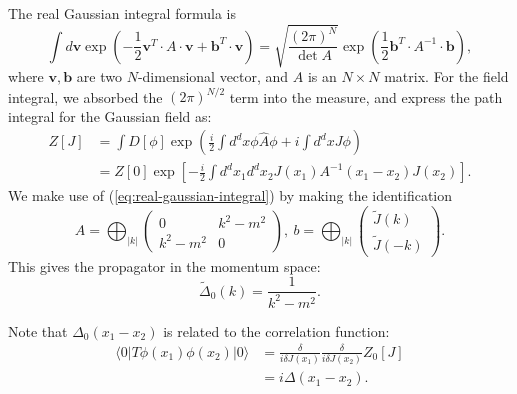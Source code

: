 \begin{framedrmk}
The real Gaussian integral formula is
\begin{equation}
	\int d\bm v \exp\left(-\frac{1}{2}\bm{v}^T \cdot A\cdot \bm{v} + \bm{b}^T \cdot \bm{v}\right) 
	= \sqrt{\frac{(2\pi)^N}{\det{A}}}\exp\left(\frac{1}{2}\bm{b}^T \cdot A^{-1} \cdot \bm{b}\right),
	\label{eq:real-gaussian-integral}
\end{equation}
where $\bm v, \bm b$ are two $N$-dimensional vector, and $A$ is an $N\times N$ matrix.
For the field integral, we absorbed the $(2\pi)^{N/2}$ term into the measure, and express the path integral for the Gaussian field as:
\begin{equation*}
\begin{aligned}
	Z[J] &= \int D[\phi] \exp\left(\frac{i}{2}\int d^dx \phi \hat{A} \phi +i \int d^d xJ \phi\right) \\
	&= Z[0] \exp\left[-\frac{i}{2}\int d^d x_1 d^d x_2 J(x_1) A^{-1}(x_1-x_2) J(x_2)\right].
\end{aligned}
\end{equation*}
We make use of (\ref{eq:real-gaussian-integral}) by making the identification 
\begin{equation*}
	A = \bigoplus_{|k|} \left(
	\begin{array}{cc} 
		0 & k^2-m^2 \\ 
		k^2-m^2 & 0 
	\end{array}\right),\ 
	b = \bigoplus_{|k|} \left(
	\begin{array}{c}
		\tilde{J}(k) \\ 
		\tilde{J}(-k) 
	\end{array}\right).
\end{equation*}
This gives the propagator in the momentum space:
\begin{equation*}
	\tilde{\Delta}_0(k) = \frac{1}{k^2-m^2}.
\end{equation*}
\end{framedrmk}



Note that $\Delta_0(x_1-x_2)$ is related to the correlation function:
\begin{equation}
\begin{aligned}
	\langle 0| T\phi(x_1)\phi(x_2)|0\rangle
	&= \frac{\delta}{i\delta J(x_1)}\frac{\delta}{i\delta J(x_2)} Z_0[J] \\
	&= i\Delta(x_1-x_2).
\end{aligned}
\end{equation}



